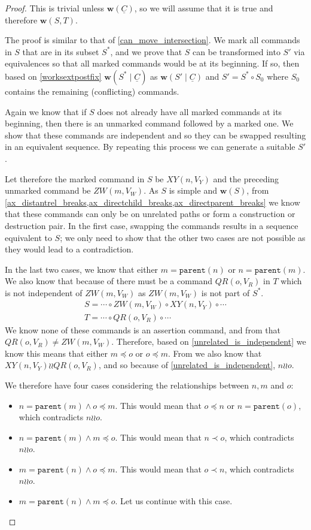 \documentclass[12pt]{article}
\newcommand{\parent}{\mathtt{parent}}
\newcommand{\fscommand}[2]{{#1#2}}
\newcommand{\cxy}{\fscommand{X}{Y}}
\newcommand{\czw}{\fscommand{Z}{W}}
\newcommand{\cqr}{\fscommand{Q}{R}}
\newcommand{\cc}{\circ} %
\newcommand{\descendant}{\prec}
\newcommand{\descendantEq}{\preceq}
\newcommand{\indep}{\mathrel{\wr\wr}} %
\newcommand{\unrel}{\indep} %
\newcommand{\workssign}{\mathbf{w}}
\newcommand{\works}[1]{\workssign({#1})}
\newcommand{\worksc}[2]{\workssign({#1}\mathrel{|}{#2})}
\newcommand{\seqset}[1]{\underline{#1}} %
\theoremstyle{definition}
\begin{document}
\begin{proof}
This is trivial unless $\works{\seqset{C}}$, so we will assume that it is true
and therefore $\works{S,T}$.

The proof is similar to that of \cref{can_move_intersection}.
We mark all commands in $S$ that are in its subset $S^*$, and
we prove that $S$ can be transformed into $S'$ via equivalences
so that all marked commands would be at its beginning.
If so, then based on \cref{worksextpostfix}
$\worksc{S^*}{\seqset{C}}$ as $\worksc{S'}{\seqset{C}}$ and $S'=S^*\cc S_0$ 
where $S_0$ contains the remaining (conflicting) commands.

Again we know that if $S$ does not already have all marked commands at its beginning,
then there is an unmarked command followed by a marked one.
We show that these commands are independent and so they can be swapped
resulting in an equivalent sequence.
By repeating this process we can generate a suitable $S'$.

Let therefore the marked command in $S$ be $\cxy(n,V_Y)$
and the preceding unmarked command be $\czw(m,V_W)$.
As $S$ is simple and $\works{S}$, from 
\cref{ax_distantrel_breaks,ax_directchild_breaks,ax_directparent_breaks}
we know that these commands can only be on unrelated paths or form a construction or destruction pair.
In the first case, swapping the commands results in a sequence equivalent to $S$;
we only need to show that the other two cases are not possible as they would lead to a contradiction.

In the last two cases, we know that either $m=\parent(n)$ or $n=\parent(m)$.
We also know that because of {\condApr} there must be 
a command $\cqr(o,V_R)$ in $T$ which is not independent of $\czw(m,V_W)$
as $\czw(m,V_W)$ is not part of $S^*$.
\begin{gather*}
S = \cdots\cc  \czw(m, V_W)\cc  \cxy(n, V_Y)\cc  \cdots \\
T = \cdots\cc  \cqr(o, V_R)\cc \cdots
\end{gather*}
We know none of these commands is an assertion command, and 
from {\condDisj} that $\cqr(o,V_R)\neq\czw(m,V_W)$.
Therefore, based on \cref{unrelated_is_independent} we know this means that
either $m\descendantEq o$ or $o\descendantEq m$.
From {\condApr} we also know that $\cxy(n,V_Y)\indep \cqr(o,V_R)$,
and so because of \cref{unrelated_is_independent},
$n\unrel o$.

We therefore have four cases considering the relationships between $n,m$ and $o$:
\begin{itemize}
\item $n=\parent(m) \wedge o\descendantEq m$.
   This would mean that $o\descendantEq n$ or $n=\parent(o)$, which contradicts $n\unrel o$.
\item $n=\parent(m) \wedge m\descendantEq o$.
   This would mean that $n\descendant o$, which contradicts $n\unrel o$.
\item $m=\parent(n) \wedge o\descendantEq m$.
   This would mean that $o\descendant n$, which contradicts $n\unrel o$.
\item $m=\parent(n) \wedge m\descendantEq o$.
   Let us continue with this case.
\end{itemize}


\end{proof}
\end{document}
